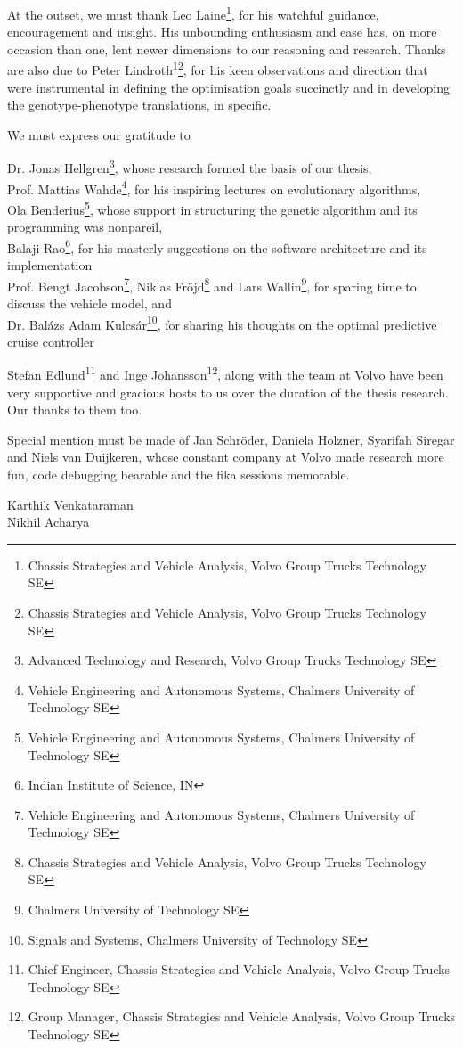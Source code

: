 At the outset, we must thank Leo Laine\footnote{Chassis Strategies and Vehicle Analysis, Volvo Group Trucks Technology SE}, for his watchful guidance, encouragement and insight. His unbounding enthusiasm and ease has, on more occasion than one, lent newer dimensions to our reasoning and research. Thanks are also due to Peter Lindroth\textsuperscript{1}\footnote{Chassis Strategies and Vehicle Analysis, Volvo Group Trucks Technology SE}, for his keen observations and direction that were instrumental in defining the optimisation goals succinctly and in developing the genotype-phenotype translations, in specific.\\

\raggedright{We must express our gratitude to\\}

Dr. Jonas Hellgren\footnote{Advanced Technology and Research, Volvo Group Trucks Technology SE}, whose research formed the basis of our thesis,\\ 

Prof. Mattias Wahde\footnote{Vehicle Engineering and Autonomous Systems, Chalmers University of Technology SE}, for his inspiring lectures on evolutionary algorithms,\\

Ola Benderius\footnote{Vehicle Engineering and Autonomous Systems, Chalmers University of Technology SE}, whose support in structuring the genetic algorithm and its programming was nonpareil,\\ 

Balaji Rao\footnote{Indian Institute of Science, IN}, for his masterly suggestions on the software architecture and its implementation\\

Prof. Bengt Jacobson\footnote{Vehicle Engineering and Autonomous Systems, Chalmers University of Technology SE}, Niklas Fr\"ojd\footnote{Chassis Strategies and Vehicle Analysis, Volvo Group Trucks Technology SE} and Lars Wallin\footnote{Chalmers University of Technology SE}, for sparing time to discuss the vehicle model, and\\

Dr. Bal\'azs Adam Kulcs\'ar\footnote{Signals and Systems, Chalmers University of Technology SE}, for sharing his thoughts on the optimal predictive cruise controller\\

\raggedright{Stefan Edlund\footnote{Chief Engineer, Chassis Strategies and Vehicle Analysis, Volvo Group Trucks Technology SE} and Inge Johansson\footnote{Group Manager, Chassis Strategies and Vehicle Analysis, Volvo Group Trucks Technology SE}, along with the team at Volvo have been very supportive and gracious hosts to us over the duration of the thesis research. Our thanks to them too.\\}

\raggedright{Special mention must be made of Jan Schr\"oder, Daniela Holzner, Syarifah Siregar and Niels van Duijkeren, whose constant company at Volvo made research more fun, code debugging bearable and the fika sessions memorable.\\}


\raggedright{Karthik Venkataraman\\
Nikhil Acharya\\}